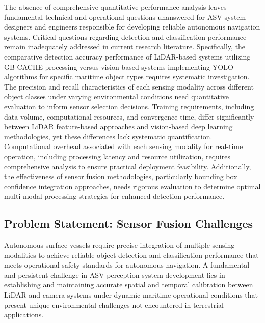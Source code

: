 \documentclass{erauthesis}
\begin{document}
The absence of comprehensive quantitative performance analysis leaves fundamental technical and operational questions unanswered for \ac{ASV} system designers and engineers responsible for developing reliable autonomous navigation systems. Critical questions regarding detection and classification performance remain inadequately addressed in current research literature. Specifically, the comparative detection accuracy performance of \ac{LiDAR}-based systems utilizing \ac{GB-CACHE} processing versus vision-based systems implementing \ac{YOLO} algorithms for specific maritime object types requires systematic investigation. The precision and recall characteristics of each sensing modality across different object classes under varying environmental conditions need quantitative evaluation to inform sensor selection decisions. Training requirements, including data volume, computational resources, and convergence time, differ significantly between \ac{LiDAR} feature-based approaches and vision-based deep learning methodologies, yet these differences lack systematic quantification. Computational overhead associated with each sensing modality for real-time operation, including processing latency and resource utilization, requires comprehensive analysis to ensure practical deployment feasibility. Additionally, the effectiveness of sensor fusion methodologies, particularly bounding box confidence integration approaches, needs rigorous evaluation to determine optimal multi-modal processing strategies for enhanced detection performance.

\subsection{Problem Statement: Sensor Fusion Challenges} \label{problem_statement2}

Autonomous surface vessels require precise integration of multiple sensing modalities to achieve reliable object detection and classification performance that meets operational safety standards for autonomous navigation. A fundamental and persistent challenge in \ac{ASV} perception system development lies in establishing and maintaining accurate spatial and temporal calibration between \ac{LiDAR} and camera systems under dynamic maritime operational conditions that present unique environmental challenges not encountered in terrestrial applications.
\end{document}
